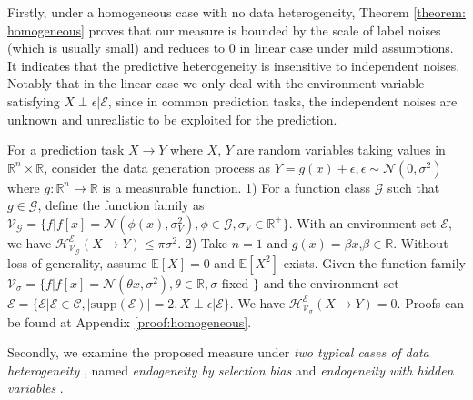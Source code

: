 Firstly, under a homogeneous case with no data heterogeneity, Theorem \ref{theorem: homogeneous} proves that our measure is bounded by the scale of label noises (which is usually small) and reduces to 0 in linear case under mild assumptions.
It indicates that the predictive heterogeneity is insensitive to independent noises.
Notably that in the linear case we only deal with the environment variable satisfying $X\perp \epsilon|\mathcal E$, since in common prediction tasks, the independent noises are unknown and unrealistic to be exploited for the prediction.

\begin{theorem}
\label{theorem: homogeneous}
	For a prediction task $X \rightarrow Y$ where $X$, $Y$ are random variables taking values in $\mathbb R^n \times \mathbb R$, 
	consider the data generation process as $Y = g(x) + \epsilon, \epsilon\sim\mathcal{N}(0,\sigma^2)$ where $g:\mathbb R^n \rightarrow  \mathbb R$ is a measurable function. 
	 1) For a function class $\mathcal G$ such that $g \in \mathcal G$, define the function family as $\mathcal V_{\mathcal G}=\{ f | f[x]=\mathcal{N}(\phi(x),\sigma_V^2), \phi \in \mathcal G, \sigma_V \in \mathbb R^+ \}$. With an environment set $\mathscr E$, we have $\mathcal{H}^\mathscr E_{\mathcal{V}_{\mathcal G}}(X \rightarrow Y)\leq \pi\sigma^2$.
	 2) Take $n=1$ and $g(x) =\beta x$,$\beta\in \mathbb R$. 
	 Without loss of generality, assume $\mathbb E[X] =0$ and $\mathbb E[X^2]$  exists. Given the function family $\mathcal{V}_\sigma=\{f | f[x]=\mathcal{N}(\theta x,\sigma^2), \theta \in \mathbb R, \sigma \text{ fixed }\}$ and the environment set $\mathscr E = \{ \mathcal  E | \mathcal E \in \mathcal C, |\text{supp}(\mathcal E)|=2, X \perp \epsilon | \mathcal E\}$. We have $\mathcal{H}^\mathscr E_{\mathcal{V}_\sigma}(X \rightarrow Y)=0$.
	 Proofs can be found at Appendix \ref{proof:homogeneous}.
\end{theorem}

Secondly, we examine the proposed measure under \emph{two typical cases of data heterogeneity} \citep{fan2014challenges}, named \emph{endogeneity by selection bias} \citep{heckman1979sample, winship1992models, cui2022stable} and \emph{endogeneity with hidden variables} \citep{fan2014challenges, arjovsky2019invariant}.

